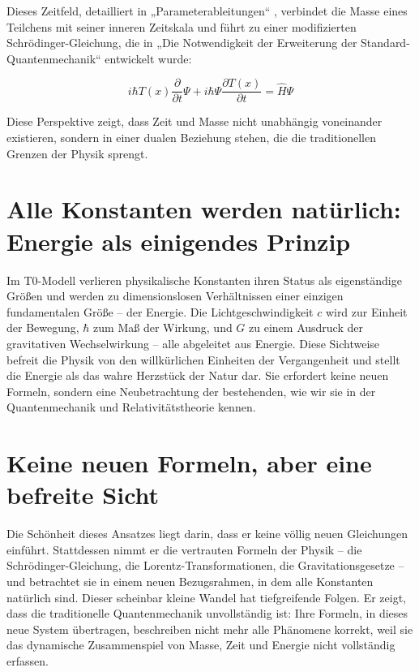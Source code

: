 \documentclass[a4paper,12pt]{article}
\newcommand{\Tfield}{T(x)}
\begin{document}
	Dieses Zeitfeld, detailliert in „Parameterableitungen“ \cite{pascher_params_2025}, verbindet die Masse eines Teilchens mit seiner inneren Zeitskala und führt zu einer modifizierten Schrödinger-Gleichung, die in „Die Notwendigkeit der Erweiterung der Standard-Quantenmechanik“ \cite{pascher_quantum_2025} entwickelt wurde:
	
	\begin{equation}
		i\hbar \Tfield \frac{\partial}{\partial t} \Psi + i\hbar \Psi \frac{\partial \Tfield}{\partial t} = \hat{H} \Psi
	\end{equation}
	
	Diese Perspektive zeigt, dass Zeit und Masse nicht unabhängig voneinander existieren, sondern in einer dualen Beziehung stehen, die die traditionellen Grenzen der Physik sprengt.
	
	\section{Alle Konstanten werden natürlich: Energie als einigendes Prinzip}
	
	Im T0-Modell verlieren physikalische Konstanten ihren Status als eigenständige Größen und werden zu dimensionslosen Verhältnissen einer einzigen fundamentalen Größe – der Energie. Die Lichtgeschwindigkeit \(c\) wird zur Einheit der Bewegung, \(\hbar\) zum Maß der Wirkung, und \(G\) zu einem Ausdruck der gravitativen Wechselwirkung – alle abgeleitet aus Energie. Diese Sichtweise befreit die Physik von den willkürlichen Einheiten der Vergangenheit und stellt die Energie als das wahre Herzstück der Natur dar. Sie erfordert keine neuen Formeln, sondern eine Neubetrachtung der bestehenden, wie wir sie in der Quantenmechanik und Relativitätstheorie kennen.
	
	\section{Keine neuen Formeln, aber eine befreite Sicht}
	
	Die Schönheit dieses Ansatzes liegt darin, dass er keine völlig neuen Gleichungen einführt. Stattdessen nimmt er die vertrauten Formeln der Physik – die Schrödinger-Gleichung, die Lorentz-Transformationen, die Gravitationsgesetze – und betrachtet sie in einem neuen Bezugsrahmen, in dem alle Konstanten natürlich sind. Dieser scheinbar kleine Wandel hat tiefgreifende Folgen. Er zeigt, dass die traditionelle Quantenmechanik unvollständig ist: Ihre Formeln, in dieses neue System übertragen, beschreiben nicht mehr alle Phänomene korrekt, weil sie das dynamische Zusammenspiel von Masse, Zeit und Energie nicht vollständig erfassen.
	
\end{document}
